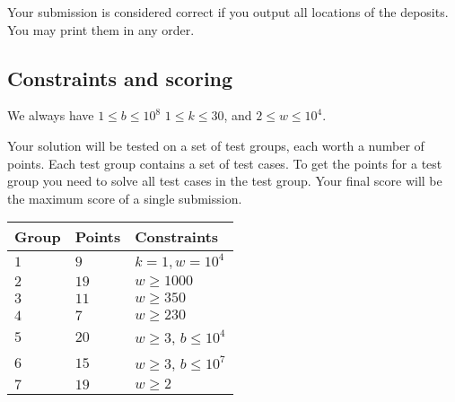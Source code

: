 Your submission is considered correct if you output all locations of the deposits.
You may print them in any order.

\subsection*{Constraints and scoring}

We always have 
$1\leq b \leq 10^8$ %
$1 \leq k \leq 30$, %
and
$2 \le w \le 10^4$. %

Your solution will be tested on a set of test groups, each worth a number of points.
Each test group contains a set of test cases.
To get the points for a test group you need to solve all test cases in the test group.
Your final score will be the maximum score of a single submission.

\medskip
\begin{tabular}{lll}
Group & Points & Constraints \\\hline
  $1$ & $9$ & $k = 1, w = 10^4$\\
  $2$ & $19$ & $w \ge 1000$\\
  $3$ & $11$ & $w \ge 350$\\
  $4$ & $7$ & $w \ge 230$\\
  $5$ & $20$ & $w \ge 3$, $b \le 10^4$\\
  $6$ & $15$ & $w \ge 3$, $b \le 10^7$\\
  $7$ & $19$ & $w \ge 2$
\end{tabular}

